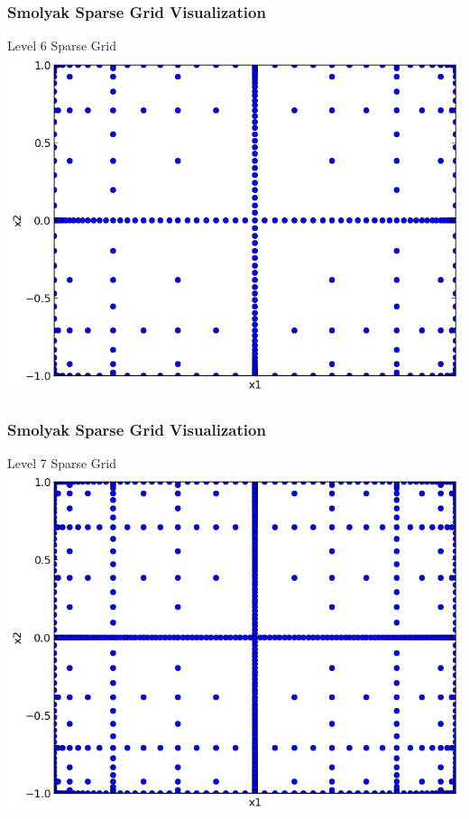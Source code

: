 \documentclass{beamer}
\begin{document}
\begin{frame}

\frametitle{Smolyak Sparse Grid Visualization}
\centering
Level 6 Sparse Grid
\includegraphics[width=.75\textwidth]{./sparse_grid_L6.png}

\end{frame}
\begin{frame}

\frametitle{Smolyak Sparse Grid Visualization}
\centering
Level 7 Sparse Grid
\includegraphics[width=.75\textwidth]{./sparse_grid_L7.png}

\end{frame}
\end{document}
